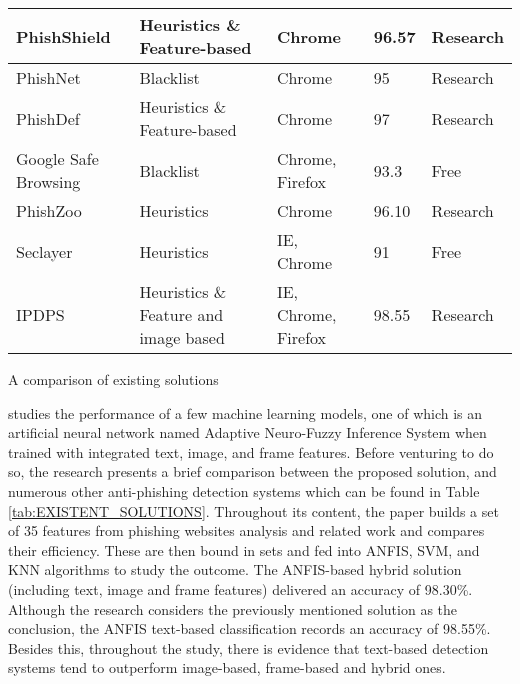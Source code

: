 \begin{singlespace}
\begin{center}
\begin{tabular}{ | m{8em} | m{13em} | m{8.5em} | m{2.3em} | m{5em} | }
			\hline
			PhishShield                  & Heuristics \& Feature-based           & Chrome              & 96.57           & Research               \\
			\hline
			PhishNet                     & Blacklist                             & Chrome              & 95              & Research               \\
			\hline
			PhishDef                     & Heuristics \& Feature-based           & Chrome              & 97              & Research               \\
			\hline
			Google Safe Browsing         & Blacklist                             & Chrome, Firefox     & 93.3            & Free                   \\
			\hline
			PhishZoo                     & Heuristics                            & Chrome              & 96.10           & Research               \\
			\hline
			Seclayer                     & Heuristics                            & IE, Chrome          & 91              & Free                   \\
			\hline
			IPDPS                        & Heuristics \& Feature and image based & IE, Chrome, Firefox & 98.55           & Research               \\
			\hline
		\end{tabular}
		\captionsetup{type=table}\caption{A comparison of existing solutions \citep{INTELLIGENT_PHISHING_ANFIS}}
	\end{center}
\end{singlespace}

\cite{INTELLIGENT_PHISHING_ANFIS} studies the performance of a few machine
learning models, one of which is an artificial neural network named Adaptive
Neuro-Fuzzy Inference System \citep{ANFIS} when trained with integrated text,
image, and frame features. Before venturing to do so, the research presents a
brief comparison between the proposed solution, and numerous other anti-phishing
detection systems which can be found in Table \ref{tab:EXISTENT_SOLUTIONS}.
Throughout its content, the paper builds a set of 35 features from phishing
websites analysis and related work and compares their efficiency. These are then
bound in sets and fed into ANFIS, SVM, and KNN algorithms to study the outcome.
The ANFIS-based hybrid solution (including text, image and frame features)
delivered an accuracy of 98.30\%. Although the research considers the previously
mentioned solution as the conclusion, the ANFIS text-based classification
records an accuracy of 98.55\%. Besides this, throughout the study, there is
evidence that text-based detection systems tend to outperform image-based,
frame-based and hybrid ones.

